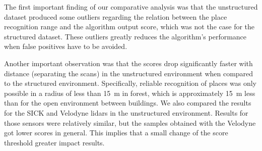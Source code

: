 The first important finding of our comparative analysis was that the unstructured dataset produced some outliers regarding the relation between the place recognition range and the algorithm output score, which was not the case for the structured dataset. These outliers greatly reduces the algorithm's performance when false positives have to be avoided.

Another important observation was that the scores drop significantly faster with distance (separating the scans) in the unstructured environment when compared to the structured environment. Specifically, reliable recognition of places was only possible in a radius of less than \SI{15}{\meter} in forest, which is approximately \SI{15}{\meter} less than for the open environment between buildings. We also compared the results for the SICK and Velodyne \gls*{lidar}s in the unstructured environment. Results for those sensors were relatively similar, but the samples obtained with the Velodyne got lower scores in general. This implies that a small change of the score threshold greater impact results. 

